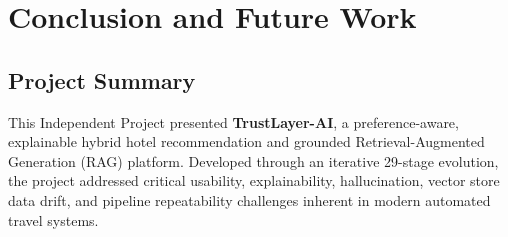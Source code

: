 \chapter{Conclusion and Future Work}\label{ch:conclusion}

\section{Project Summary}
This Independent Project presented \textbf{TrustLayer-AI}, a preference-aware, explainable hybrid hotel recommendation and grounded Retrieval-Augmented Generation (RAG) platform. Developed through an iterative 29-stage evolution, the project addressed critical usability, explainability, hallucination, vector store data drift, and pipeline repeatability challenges inherent in modern automated travel systems.

